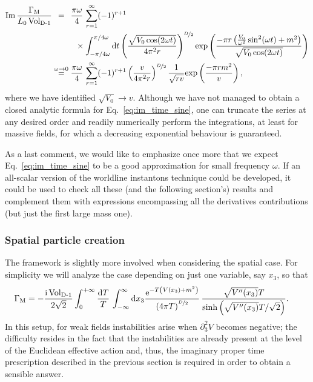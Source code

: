 \documentclass[12pt,a4paper]{article}
\numberwithin{equation}{section}
\numberwithin{equation}{section}
\newcommand{\mathi}{{\rm i}}
\begin{document}
\begin{align}
    \begin{split}\label{eq:im_time_oscillating}
\operatorname{Im} \frac{\Gamma_{\rm M}}{L_0 \operatorname{Vol_{\rm D-1}}}  
&\overset{\phantom{\omega\to 0}}{=}\frac{ \pi\omega }{4} \, \sum_{r=1}^{\infty} (-1)^{r+1}
\\
&\hspace{1cm}\times\int^{\pi/4\omega}_{-\pi/4\omega} {\rm d}t \left(\frac{\sqrt{V_0 \cos(2\omega t)} }{ 4\pi^2 r }\right)^{\nicefrac{D}{2}} \mathrm{exp}\left(\frac{-\pi r \left(\frac{V_0}{\omega^2} \sin^2(\omega t)+m^2\right)}{\sqrt{V_0 \cos(2\omega t)}}\right) 
\\
&\overset{\omega\to 0}{=}\frac{ \pi\omega}{4} \, \sum_{r=1}^{\infty} (-1)^{r+1} \left(\frac{v }{ 4\pi^2 r }\right)^{\nicefrac{D}{2}} \frac{1}{\sqrt{r v}}  \mathrm{exp}\left(\frac{-\pi r m^2}{v}\right),
\end{split}
\end{align}
where we have identified $\sqrt{V_0}\to v$.
Although we have not managed to obtain a closed analytic formula for Eq.~\eqref{eq:im_time_sine}, one can truncate the series at any desired order and readily numerically perform the integrations, at least for massive fields, for which a decreasing exponential behaviour is guaranteed.

As a last comment, we would like to emphasize once more that we expect Eq.~\eqref{eq:im_time_sine} to be a good approximation for small frequency $\omega$. If an all-scalar version of the worldline instantons technique could be developed, it could be used to  check all these (and the following section's) results and complement them with expressions encompassing all the derivatives contributions (but just the first large mass one). 



\subsubsection{Spatial particle creation}\label{sec:spatial_pair}
The framework is slightly more involved when  considering the spatial case. For simplicity we will analyze the case depending on just one variable, say $x_3$, so that
\begin{align}
    \begin{split}
    \label{eq:eff_sapce_inho}
\Gamma_{\rm M}
&= -\frac{\mathi \operatorname{Vol_{\rm D-1}}}{2\sqrt{2}} \int_0^{+\infty} \frac{{\rm d}T}{T} \, \int_{-\infty}^{\infty} {\rm d}x_3\frac{\mathrm{e}^{-T \left(V(x_3)+m^2\right)}}{\left( 4\pi T \right)^{\nicefrac{D}{2}}} \,  \frac{\sqrt{V''(x_3)}T}{ \sinh\left(\sqrt{V''(x_3)} T/\sqrt{2}\right)}. \
\end{split}
\end{align}
In this setup, for weak fields instabilities arise when $\partial^2_3 V$ becomes negative; the difficulty resides in the fact that the instabilities are already present  at the level of the Euclidean effective action and, thus, the imaginary proper time prescription described in the previous section is required in order to obtain a sensible answer. 
\end{document}
